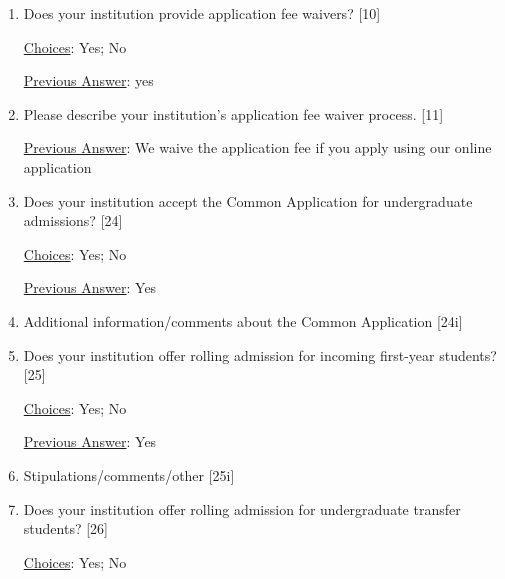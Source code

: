 \documentclass[12 pt, a4paper]{article}
\begin{document}
\begin{Form}
\begin{enumerate}\item Does your institution provide application fee waivers? [10] \medskip

\underline{Choices}: Yes; No \medskip

\underline{Previous Answer}: yes\medskip

\TextField[width = 6 in,multiline, name=90013]{} \medskip

\item Please describe your institution's application fee waiver process. [11] \medskip

\underline{Previous Answer}: We waive the application fee if you apply using our online application\medskip

\TextField[width = 6 in,multiline, name=90014]{} \medskip

\item Does your institution accept the Common Application for undergraduate admissions? [24] \medskip

\underline{Choices}: Yes; No \medskip

\underline{Previous Answer}: Yes\medskip

\TextField[width = 6 in,multiline, name=90027]{} \medskip

\item Additional information/comments about the Common Application [24i] \medskip

\TextField[width = 6 in,multiline, name=90028]{} \medskip

\item Does your institution offer rolling admission for incoming first-year students? [25] \medskip

\underline{Choices}: Yes; No \medskip

\underline{Previous Answer}: Yes\medskip

\TextField[width = 6 in,multiline, name=90029]{} \medskip

\item Stipulations/comments/other [25i] \medskip

\TextField[width = 6 in,multiline, name=90030]{} \medskip

\item Does your institution offer rolling admission for undergraduate transfer students? [26] \medskip

\underline{Choices}: Yes; No \medskip


\end{enumerate}
\end{Form}
\end{document}
